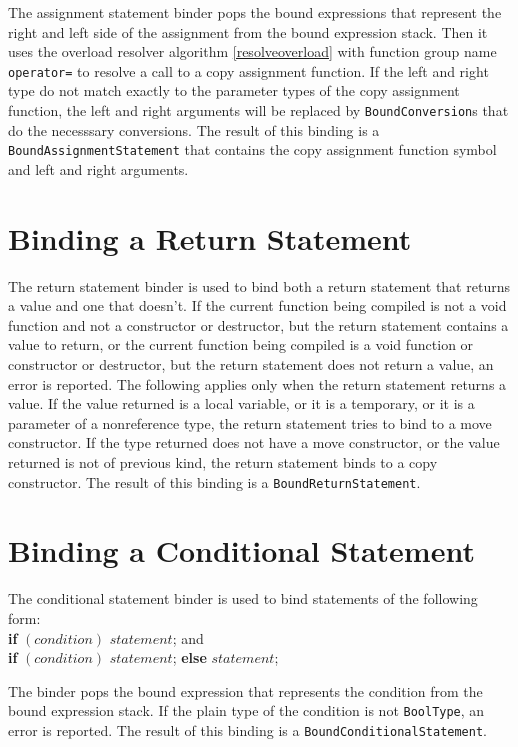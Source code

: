 \documentclass[a4paper,oneside,11pt]{book}
\theoremstyle{definition}
\begin{document}
The assignment statement binder pops the bound expressions that represent the right and left side of the assignment from the bound expression stack.
Then it uses the overload resolver algorithm \ref{resolveoverload} with function  group name \verb|operator=| to resolve
a call to a copy assignment function.
If the left and right type do not match exactly to the parameter types of the copy assignment function,
the left and right arguments will be replaced by \verb|BoundConversion|s that do the necesssary conversions.
The result of this binding is a \verb|BoundAssignmentStatement| that contains the copy assignment function symbol and left and right arguments.

\section{Binding a Return Statement}

The return statement binder is used to bind both a return statement that returns a value and one that doesn't.
If the current function being compiled is not a void function and not a constructor or destructor, but the return statement contains a value to return,
or the current function being compiled is a void function or constructor or destructor, but the return statement does not return a value, an error is reported.
The following applies only when the return statement returns a value.
If the value returned is a local variable, or it is a temporary, or it is a parameter of a nonreference type, the return statement tries
to bind to a move constructor. If the type returned does not have a move constructor, or the value returned is not of previous kind, the return statement
binds to a copy constructor.
The result of this binding is a \verb|BoundReturnStatement|.

\section{Binding a Conditional Statement}

The conditional statement binder is used to bind statements of the following form:\\
\textbf{if} $(condition)$ $statement$; and\\
\textbf{if} $(condition)$ $statement$; \textbf{else} $statement$;
\begin{flushleft}
The binder pops the bound expression that represents the condition from the bound expression stack.
If the plain type of the condition is not \verb|BoolType|, an error is reported.
The result of this binding is a \verb|BoundConditionalStatement|.
\end{flushleft}
\end{document}
